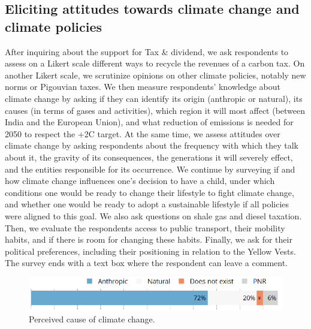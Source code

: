 \documentclass[english,5p,authoryear]{elsarticle}
\begin{document}
    \subsection{Eliciting attitudes towards climate change and climate policies}

After inquiring about the support for Tax \& dividend, we ask respondents to assess on a Likert scale different ways to recycle the revenues of a carbon tax. On another Likert scale, we scrutinize opinions on other climate policies, notably new norms or Pigouvian taxes. We then measure respondents' knowledge about climate change by asking if they can identify its origin (anthropic or natural), its causes (in terms of gases and activities), which region it will most affect (between India and the European Union), and what reduction of emissions is needed for 2050 to respect the +2\textdegree{}C target. At the same time, we assess attitudes over climate change by asking respondents about the frequency with which they talk about it, the gravity of its consequences, the generations it will severely effect, and the entities responsible for its occurrence. We continue by surveying if and how climate change influences one's decision to have a child, under which conditions one would be ready to change their lifestyle to fight climate change, and whether one would be ready to adopt a sustainable lifestyle if all policies were aligned to this goal. We also ask questions on shale gas and diesel taxation. Then, we evaluate the respondents access to public transport, their mobility habits, and if there is room for changing these habits. Finally, we ask for their political preferences, including their positioning in relation to the Yellow Vests. The survey ends with a text box where the respondent can leave a comment.

\begin{figure}[t]
\centering
\includegraphics[width=\columnwidth]{Images/CC_cause_nolegend.png}
\caption{Perceived cause of climate change.}
\label{fig:cause}
\end{figure}
\end{document}
